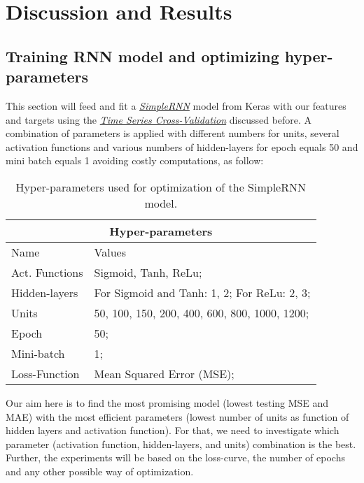 \section{Discussion and Results}
\label{chap:Discussion and Results}

\subsection{Training RNN model and optimizing hyper-parameters}
\label{chap:Training RNN model and optimizing hyper-parameters}

\quad This section will feed and fit a \href{https://www.tensorflow.org/api_docs/python/tf/keras/layers/SimpleRNN}{\textit{SimpleRNN}} model from Keras with our features and targets using the \hyperref[chap:Time series Cross-Validation]{\textit{Time Series Cross-Validation}} discussed before. A combination of parameters is applied with different numbers for units, several activation functions and various numbers of hidden-layers for epoch equals 50 and mini batch equals 1 avoiding costly computations, as follow:

\begin{table}[H]
\centering
\begin{tabular}{ |p{2.5cm}||p{7cm}|  }
\hline
\multicolumn{2}{|c|}{Hyper-parameters} \\
\hline
Name & Values\\
\hline
Act. Functions & Sigmoid, Tanh, ReLu;\\
Hidden-layers & For Sigmoid and Tanh: 1, 2; For ReLu: 2, 3;\\
Units & 50, 100, 150, 200, 400, 600, 800, 1000, 1200;\\
Epoch & 50;\\
Mini-batch & 1;\\
Loss-Function & Mean Squared Error (MSE);\\
\hline
\end{tabular}
\label{table:Hyper-parameters for SimpleRNN}
\caption{Hyper-parameters used for optimization of the SimpleRNN model.}
\end{table}

Our aim here is to find the most promising model (lowest testing MSE and MAE) with the most efficient parameters (lowest number of units as function of hidden layers and activation function). For that, we need to investigate which parameter (activation function, hidden-layers, and units) combination is the best. Further, the experiments will be based on the loss-curve, the number of epochs and any other possible way of optimization.\\

